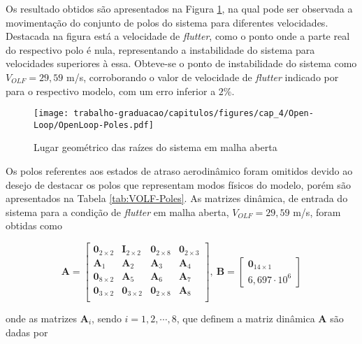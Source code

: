 Os resultado obtidos são apresentados na Figura \ref{fig:OpenLoop-Poles}, na qual pode ser observada a movimentação do conjunto de polos do sistema para diferentes velocidades. Destacada na figura está a velocidade de \textit{flutter}, como o ponto onde a parte real do respectivo polo é nula, representando a instabilidade do sistema para velocidades superiores à essa. Obteve-se o ponto de instabilidade do sistema como $V_{OLF} = 29,59$ m/s, corroborando o valor de velocidade de \textit{flutter} indicado por \textcite{book:Fung} para o respectivo modelo, com um erro inferior a $2\%$.

\begin{figure}[ht]
    \centering
    \caption{Lugar geométrico das raízes do sistema em malha aberta}
    \noindent\texttt{[image: trabalho-graduacao/capitulos/figures/cap\_4/Open-Loop/OpenLoop-Poles.pdf]}
    \label{fig:OpenLoop-Poles}
\end{figure}

\newpage

Os polos referentes aos estados de atraso aerodinâmico foram omitidos devido ao desejo de destacar os polos que representam modos físicos do modelo, porém são apresentados na Tabela \ref{tab:VOLF-Poles}. As matrizes dinâmica, de entrada do sistema para a condição de \textit{flutter} em malha aberta, $V_{OLF} = 29,59$ m/s, foram obtidas como

\[
\boldsymbol{A} = 
\begin{bmatrix}
	\boldsymbol{0}_{2 \times 2} & \boldsymbol{I}_{2 \times 2}   & \boldsymbol{0}_{2 \times 8}   & \boldsymbol{0}_{2 \times 3} 	\\
	\boldsymbol{A}_{1} 	        & \boldsymbol{A}_{2} 	        & \boldsymbol{A}_{3} 	        & \boldsymbol{A}_{4} 		    \\
	\boldsymbol{0}_{8 \times 2} & \boldsymbol{A}_{5}  	        & \boldsymbol{A}_{6}	        & \boldsymbol{A}_{7}		    \\
	\boldsymbol{0}_{3 \times 2} & \boldsymbol{0}_{3 \times 2}   & \boldsymbol{0}_{2 \times 8}   & \boldsymbol{A}_{8}		    \\
\end{bmatrix}, \ \boldsymbol{B} = \begin{bmatrix}  \boldsymbol{0}_{14 \times 1} \\ 6,697\cdot10^{6} \end{bmatrix}
\]

\noindent onde as matrizes $\boldsymbol{A}_{i}$, sendo $i=1, 2, \cdots, 8$, que definem a matriz dinâmica $\boldsymbol{A}$ são dadas por

